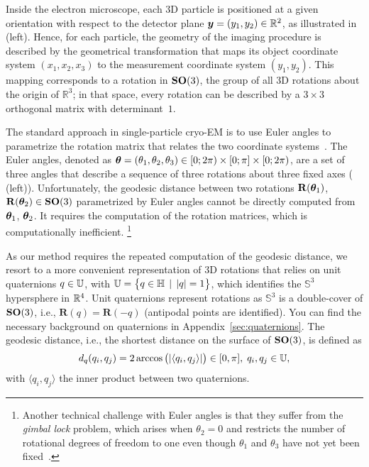 Inside the electron microscope, each 3D particle is positioned at a given orientation with respect to the detector plane ${\boldsymbol{y}}=(y_1,y_2)\in \mathbb{R}^2$, as illustrated in  (left). Hence, for each particle, the geometry of the imaging procedure is described by the geometrical transformation that maps its object coordinate system $(x_1,x_2,x_3)$ to the measurement coordinate system $(y_1,y_2)$. This mapping corresponds to a rotation in $\mathrm{\mathbf{SO}}(3)$, the group of all 3D rotations about the origin of $\mathbb{R}^3$; in that space, every rotation can be described by a $3\times3$ orthogonal matrix with determinant~$1$.

The standard approach in single-particle cryo-EM is to use Euler angles to parametrize the rotation matrix that relates the two coordinate systems~\cite{sorzano2014interchanging}.
The Euler angles, denoted as ${\boldsymbol{\theta}}=(\theta_1,\theta_2,\theta_3)\in [0;2\pi)\times [0;\pi] \times [0;2\pi)$, are a set of three angles that describe a sequence of three rotations about three fixed axes ( (left)).
Unfortunately, the geodesic distance between two rotations $\mathbf{R}({\boldsymbol{\theta}}_1)$, $\mathbf{R}({\boldsymbol{\theta}}_2)\in \mathrm{\mathbf{SO}}(3)$ parametrized by Euler angles cannot be directly computed from ${\boldsymbol{\theta}}_1$, ${\boldsymbol{\theta}}_2$.
It requires the computation of the rotation matrices, which is computationally inefficient.%
\footnote{Another technical challenge with Euler angles is that they suffer from the \textit{gimbal lock} problem, which arises when $\theta_2=0$ and restricts the number of rotational degrees of freedom to one even though $\theta_1$ and $\theta_3$ have not yet been fixed~\cite{koks2006explorations}.}

As our method requires the repeated computation of the geodesic distance, we resort to a more convenient representation of 3D rotations that relies on unit quaternions $q \in \mathbb{U}$, with  $\mathbb{U} = \big\{ q \in \mathbb{H} \; \, | \; \, \lvert q \rvert = 1 \big\}$, which identifies the $\mathbb{S}^3$ hypersphere in $\mathbb{R}^4$.
Unit quaternions represent rotations as $\mathbb{S}^3$ is a double-cover of $\mathrm{\mathbf{SO}}(3)$, i.e., $\mathbf{R}(q) = \mathbf{R}(-q)$ (antipodal points are identified).
You can find the necessary background on quaternions in Appendix~\ref{sec:quaternions}.
The geodesic distance, i.e., the shortest distance on the surface of $\mathrm{\mathbf{SO}}(3)$, is defined as
\begin{equation}
    d_q(q_i, q_j) = 2 \arccos \big(| \langle q_i, q_j \rangle| \big) \in [0,\pi], \; q_i, q_j \in \mathbb{U},
    \label{eqn:distance:orientations}
\end{equation}
with $\langle q_i, q_j \rangle$ the inner product between two quaternions.

